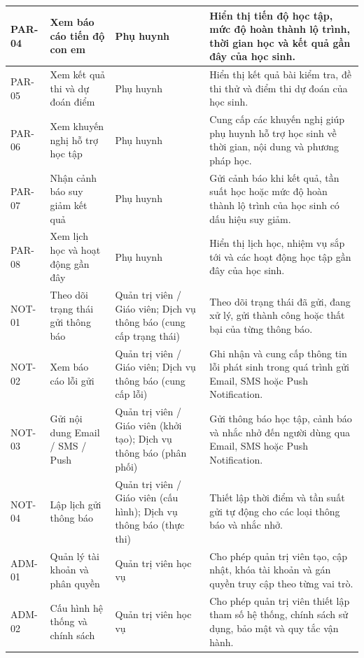 \documentclass[12pt,a4paper,oneside]{report}
\begin{document}
\begin{longtable}{|p{}|p{}|p{}|p{}|}
PAR-04 &
Xem báo cáo tiến độ con em &
Phụ huynh &
Hiển thị tiến độ học tập, mức độ hoàn thành lộ trình, thời gian học và kết quả gần đây của học sinh. \\
\hline

PAR-05 &
Xem kết quả thi và dự đoán điểm &
Phụ huynh &
Hiển thị kết quả bài kiểm tra, đề thi thử và điểm thi dự đoán của học sinh. \\
\hline

PAR-06 &
Xem khuyến nghị hỗ trợ học tập &
Phụ huynh &
Cung cấp các khuyến nghị giúp phụ huynh hỗ trợ học sinh về thời gian, nội dung và phương pháp học. \\
\hline

PAR-07 &
Nhận cảnh báo suy giảm kết quả &
Phụ huynh &
Gửi cảnh báo khi kết quả, tần suất học hoặc mức độ hoàn thành lộ trình của học sinh có dấu hiệu suy giảm. \\
\hline

PAR-08 &
Xem lịch học và hoạt động gần đây &
Phụ huynh &
Hiển thị lịch học, nhiệm vụ sắp tới và các hoạt động học tập gần đây của học sinh. \\
\hline

NOT-01 &
Theo dõi trạng thái gửi thông báo &
Quản trị viên / Giáo viên; Dịch vụ thông báo (cung cấp trạng thái) &
Theo dõi trạng thái đã gửi, đang xử lý, gửi thành công hoặc thất bại của từng thông báo. \\
\hline

NOT-02 &
Xem báo cáo lỗi gửi &
Quản trị viên / Giáo viên; Dịch vụ thông báo (cung cấp lỗi) &
Ghi nhận và cung cấp thông tin lỗi phát sinh trong quá trình gửi Email, SMS hoặc Push Notification. \\
\hline

NOT-03 &
Gửi nội dung Email / SMS / Push &
Quản trị viên / Giáo viên (khởi tạo); Dịch vụ thông báo (phân phối) &
Gửi thông báo học tập, cảnh báo và nhắc nhở đến người dùng qua Email, SMS hoặc Push Notification. \\
\hline

NOT-04 &
Lập lịch gửi thông báo &
Quản trị viên / Giáo viên (cấu hình); Dịch vụ thông báo (thực thi) &
Thiết lập thời điểm và tần suất gửi tự động cho các loại thông báo và nhắc nhở. \\
\hline

ADM-01 &
Quản lý tài khoản và phân quyền &
Quản trị viên học vụ &
Cho phép quản trị viên tạo, cập nhật, khóa tài khoản và gán quyền truy cập theo từng vai trò. \\
\hline

ADM-02 &
Cấu hình hệ thống và chính sách &
Quản trị viên học vụ &
Cho phép quản trị viên thiết lập tham số hệ thống, chính sách sử dụng, bảo mật và quy tắc vận hành. \\
\hline


\end{longtable}
\end{document}
